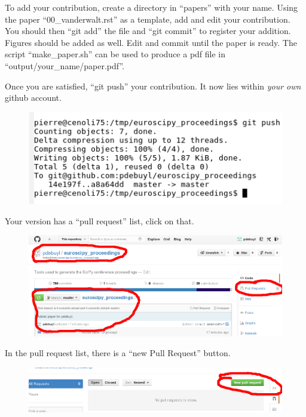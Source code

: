 \documentclass[portrait]{sciposter}
\begin{document}
\begin{multicols}{2}
  To add your contribution, create a directory in ``papers'' with your
  name. Using the paper ``00\_vanderwalt.rst'' as a template, add and edit your
  contribution.\\

  You should then ``git add'' the file and ``git commit'' to register your
  addition. Figures should be added as well. Edit and commit until the paper is
  ready. The script ``make\_paper.sh'' can be used to produce a pdf file in
  ``output/your\_name/paper.pdf''.

  Once you are satisfied, ``git push'' your contribution. It now lies within
  {\em your own} github account.

  \begin{figure}[h]
    \centering
    \includegraphics[width=.6\linewidth]{txt_push}
  \end{figure}

  Your version has a ``pull request'' list, click on that.

  \begin{figure}[h]
    \centering
    \includegraphics[width=\linewidth]{mycommit}
  \end{figure}

  In the pull request list, there is a ``new Pull Request'' button.

  \begin{figure}[h]
    \centering
    \includegraphics[width=0.75\linewidth]{mypr}
  \end{figure}


\end{multicols}
\end{document}
